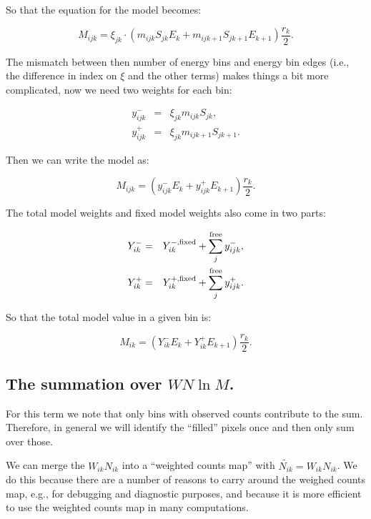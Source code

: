 \documentclass[preprint]{aastex}
\begin{document}
\noindent So that the equation for the model becomes:

\begin{equation}
  M_{ijk} = \xi_{jk} \cdot (m_{ijk} S_{jk} E_k +  m_{ijk+1} S_{jk+1} E_{k+1}) \frac{r_k}{2}.
\end{equation}

The mismatch between then number of energy bins and energy bin edges
(i.e., the difference in index on $\xi$ and the other terms) makes
things a bit more complicated, now we need two weights for each bin:

\begin{eqnarray}
  y_{ijk}^{-} & = & \xi_{jk} m_{ijk} S_{jk}, \nonumber \\
  y_{ijk}^{+} & = & \xi_{jk} m_{ijk+1} S_{jk+1}.
\end{eqnarray}

\noindent Then we can write the model as:

\begin{equation}
  M_{ijk} = ( y_{ijk}^{-} E_k + y_{ijk}^{+} E_{k+1} ) \frac{r_k}{2}.
\end{equation}

\noindent The total model weights and fixed model weights
also come in two parts:

\begin{eqnarray}
  Y_{ik}^{-} & = & Y_{ik}^{-,\rm fixed} + \sum_j^{\rm free} y_{ijk}^{-}, \nonumber \\
  Y_{ik}^{+} & = & Y_{ik}^{+,\rm fixed} + \sum_j^{\rm free} y_{ijk}^{+}.
\end{eqnarray}

\noindent So that the total model value in a given bin is:

\begin{equation}
  M_{ik} = ( Y_{ik}^{-} E_k + Y_{ik}^{+} E_{k+1} ) \frac{r_k}{2}.
\end{equation}


\subsection{The summation over $W N \ln M$.}\label{subsec:like_sum1}

For this term we note that only bins with observed counts contribute
to the sum.  Therefore, in general we will identify the ``filled''
pixels once and then only sum over those.

We can merge the $W_{ik} N_{ik}$ into a ``weighted counts map'' with
$\tilde{N_{ik}} = W_{ik} N_{ik}$.  We do this because there are a
number of reasons to carry around the weighed counts map, e.g., for
debugging and diagnostic purposes, and because it is more efficient to
use the weighted counts map in many computations.
\end{document}
